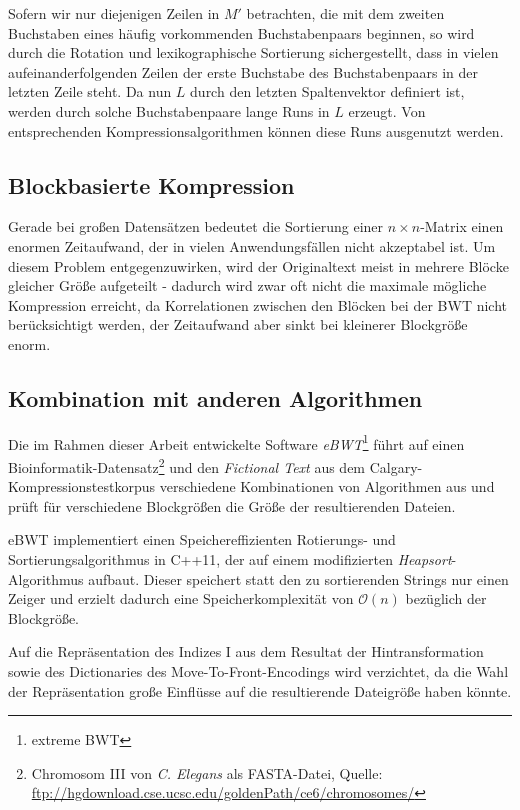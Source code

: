 \documentclass[ngerman,pdftex,paper=A4,DIV=calc,titlepage,12pt]{scrartcl}
\newtheorem[L]{boxedDefinition}{Definition}
\begin{document}
Sofern wir nur diejenigen Zeilen in $M'$ betrachten, die mit dem zweiten Buchstaben eines häufig vorkommenden Buchstabenpaars beginnen, so wird durch die Rotation und lexikographische Sortierung sichergestellt, dass    in vielen aufeinanderfolgenden Zeilen der erste Buchstabe des Buchstabenpaars in der letzten Zeile steht. Da nun $L$ durch den letzten Spaltenvektor definiert ist, werden durch solche Buchstabenpaare lange Runs in $L$ erzeugt. Von entsprechenden Kompressionsalgorithmen können diese Runs ausgenutzt werden.

\subsection{Blockbasierte Kompression}
Gerade bei großen Datensätzen bedeutet die Sortierung einer $n \times n$-Matrix einen enormen Zeitaufwand, der in vielen Anwendungsfällen nicht akzeptabel ist. Um diesem Problem entgegenzuwirken, wird der Originaltext meist in mehrere Blöcke gleicher Größe aufgeteilt - dadurch wird zwar oft nicht die maximale mögliche Kompression erreicht, da Korrelationen zwischen den Blöcken bei der BWT nicht berücksichtigt werden, der Zeitaufwand aber sinkt bei kleinerer Blockgröße enorm.

\subsection{Kombination mit anderen Algorithmen}
Die im Rahmen dieser Arbeit entwickelte Software \textit{eBWT}\footnote{extreme BWT} führt auf einen Bioinformatik-Datensatz\footnote{Chromosom III von \textit{C. Elegans} als FASTA-Datei, Quelle: \url{ftp://hgdownload.cse.ucsc.edu/goldenPath/ce6/chromosomes/}} und den \textit{Fictional Text} aus dem Calgary-Kompressionstestkorpus verschiedene Kombinationen von Algorithmen aus und prüft für verschiedene Blockgrößen die Größe der resultierenden Dateien.

eBWT implementiert einen Speichereffizienten Rotierungs- und Sortierungsalgorithmus in C++11, der auf einem modifizierten \textit{Heapsort}-Algorithmus aufbaut. Dieser speichert statt den zu sortierenden Strings nur einen Zeiger und erzielt dadurch eine Speicherkomplexität von $\mathcal{O}(n)$ bezüglich der Blockgröße.

Auf die Repräsentation des Indizes I aus dem Resultat der Hintransformation sowie des Dictionaries des Move-To-Front-Encodings wird verzichtet, da die Wahl der Repräsentation große Einflüsse auf die resultierende Dateigröße haben könnte.
\end{document}

